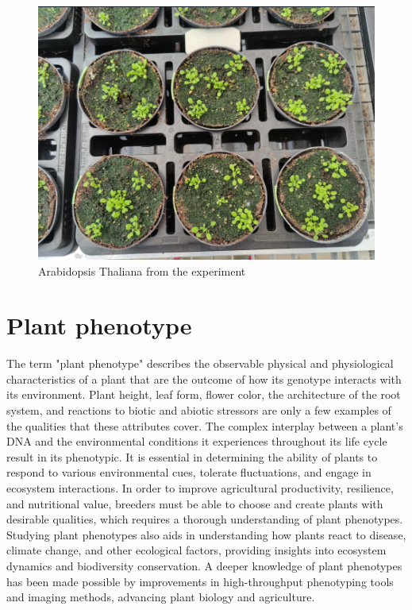 \documentclass[a4paper,12pt]{report}%
\renewcommand{\\}{\vspace*{0.5\baselineskip} \newline}
\begin{document}
\begin{figure}[h]
\centering
	\includegraphics[scale=1.0]{images/Arabidopsis.png}\\
	\begin{footnotesize}
		\caption{Arabidopsis Thaliana from the experiment}
		\label{Arabidopsis Thaliana from the experiment}
	\end{footnotesize}
\end{figure}


\section{Plant phenotype}
The term "plant phenotype" describes the observable physical and physiological characteristics of a plant that are the outcome of how its genotype interacts with its environment. Plant height, leaf form, flower color, the architecture of the root system, and reactions to biotic and abiotic stressors are only a few examples of the qualities that these attributes cover. The complex interplay between a plant's DNA and the environmental conditions it experiences throughout its life cycle result in its phenotypic.
It is essential in determining the ability of plants to respond to various environmental cues, tolerate fluctuations, and engage in ecosystem interactions. In order to improve agricultural productivity, resilience, and nutritional value, breeders must be able to choose and create plants with desirable qualities, which requires a thorough understanding of plant phenotypes. Studying plant phenotypes also aids in understanding how plants react to disease, climate change, and other ecological factors, providing insights into ecosystem dynamics and biodiversity conservation. A deeper knowledge of plant phenotypes has been made possible by improvements in high-throughput phenotyping tools and imaging methods, advancing plant biology and agriculture.
\end{document}
